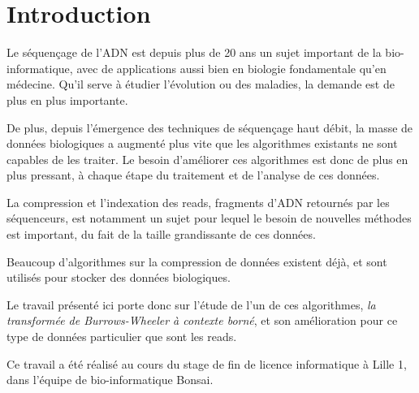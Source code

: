 \section*{Introduction} %

Le séquençage de l'ADN est depuis plus de 20 ans un sujet important de la bio-informatique, avec de applications aussi bien en biologie fondamentale qu'en médecine. Qu'il serve à étudier l'évolution ou des maladies, la demande est de plus en plus importante.

De plus, depuis l'émergence des techniques de séquençage haut débit, la masse de données biologiques a augmenté plus vite que les algorithmes existants ne sont capables de les traiter. Le besoin d'améliorer ces algorithmes est donc de plus en plus pressant, à chaque étape du traitement et de l'analyse de ces données.

La compression et l'indexation des reads, fragments d'ADN retournés par les séquenceurs, est notamment un sujet pour lequel le besoin de nouvelles méthodes est important, du fait de la taille grandissante de ces données.

Beaucoup d'algorithmes sur la compression de données existent déjà, et sont utilisés pour stocker des données biologiques. 

Le travail présenté ici porte donc sur l'étude de l'un de ces algorithmes, \textit{la transformée de Burrows-Wheeler à contexte borné}, et son amélioration pour ce type de données particulier que sont les reads.

Ce travail a été réalisé au cours du stage de fin de licence informatique à Lille 1, dans l'équipe de bio-informatique Bonsai.






